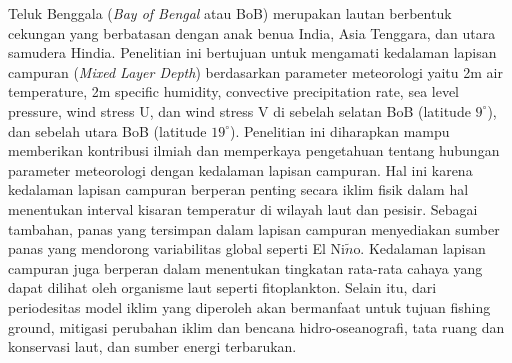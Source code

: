 \begin{spacing}{1.5}
	\pagestyle{empty}
	\begin{center}
		\vskip 1cm
		\justifying
		Teluk Benggala (\textit{Bay of Bengal} atau BoB) merupakan lautan berbentuk cekungan yang berbatasan dengan anak benua India, Asia Tenggara, dan utara samudera Hindia. Penelitian ini bertujuan untuk mengamati kedalaman lapisan campuran (\textit{Mixed Layer Depth}) berdasarkan parameter meteorologi yaitu 2m air temperature, 2m specific humidity, convective precipitation rate, sea level pressure, wind stress U, dan wind stress V di sebelah selatan BoB (latitude $9^\circ$), dan sebelah utara BoB (latitude $19^\circ$). Penelitian ini diharapkan mampu memberikan kontribusi ilmiah dan memperkaya pengetahuan tentang hubungan parameter meteorologi dengan kedalaman lapisan campuran. Hal ini karena kedalaman lapisan campuran berperan penting secara iklim fisik dalam hal menentukan interval kisaran temperatur di wilayah laut dan pesisir. Sebagai tambahan, panas yang tersimpan dalam lapisan campuran menyediakan sumber panas yang mendorong variabilitas global seperti El Ni$\tilde{n}$o. Kedalaman lapisan campuran juga berperan dalam menentukan tingkatan rata-rata cahaya yang dapat dilihat oleh organisme laut seperti fitoplankton. Selain itu, dari periodesitas model iklim yang diperoleh akan bermanfaat untuk tujuan fishing ground, mitigasi perubahan iklim dan bencana hidro-oseanografi, tata ruang dan konservasi laut, dan sumber energi terbarukan.
	\end{center}
\end{spacing}
\pagestyle{empty}